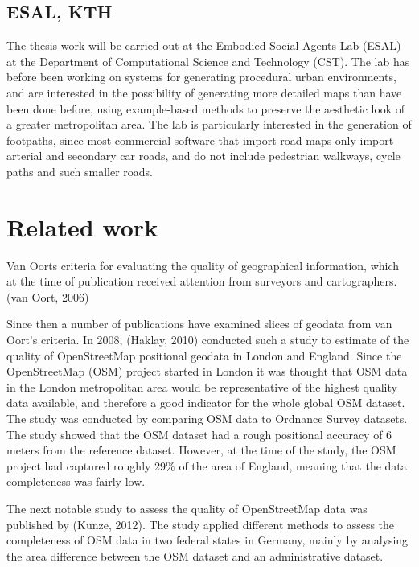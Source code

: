 \documentclass[a4paper]{article}
\begin{document}
\subsection{ESAL, KTH}
The thesis work will be carried out at the Embodied Social Agents Lab (ESAL) at the Department of Computational Science and Technology (CST). The lab has before been working on systems for generating procedural urban environments, and are interested in the possibility of generating more detailed maps than have been done before, using example-based methods to preserve the aesthetic look of a greater metropolitan area. The lab is particularly interested in the generation of footpaths, since most commercial software that import road maps only import arterial and secondary car roads, and do not include pedestrian walkways, cycle paths and such smaller roads.

\section{Related work}
Van Oorts criteria for evaluating the quality of geographical information, which at the time of publication received attention from surveyors and cartographers. (van Oort, 2006)

Since then a number of publications have examined slices of geodata from van Oort's criteria. In 2008, (Haklay, 2010) conducted such a study to estimate of the quality of OpenStreetMap positional geodata in London and England. Since the OpenStreetMap (OSM) project started in London it was thought that OSM data in the London metropolitan area would be representative of the highest quality data available, and therefore a good indicator for the whole global OSM dataset. The study was conducted by comparing OSM data to Ordnance Survey datasets. The study showed that the OSM dataset had a rough positional accuracy of 6 meters from the reference dataset. However, at the time of the study, the OSM project had captured roughly 29\% of the area of England, meaning that the data completeness was fairly low.

The next notable study to assess the quality of OpenStreetMap data was published by (Kunze, 2012). The study applied different methods to assess the completeness of OSM data in two federal states in Germany, mainly by analysing the area difference between the OSM dataset and an administrative dataset.
\end{document}
